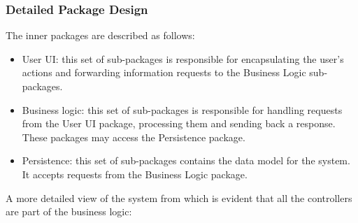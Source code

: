 \documentclass[a4paper,11pt]{report} %
\begin{document}
	\subsubsection{Detailed Package Design}
	The inner packages are described as follows:\\
	\begin{itemize}
		\item User UI:	this set of sub-packages is responsible for encapsulating the user's actions and forwarding information requests to the Business Logic sub-packages.
		\item Business logic: this set of sub-packages is responsible for handling requests from the User UI package, processing them and sending back a response. These packages may access the Persistence package.
		\item Persistence: this set of sub-packages contains the data model for the system. It accepts requests from the Business Logic package.
	\end{itemize}
	A more detailed view of the system from which is evident that all the controllers are part of the business logic:\\
\end{document}
